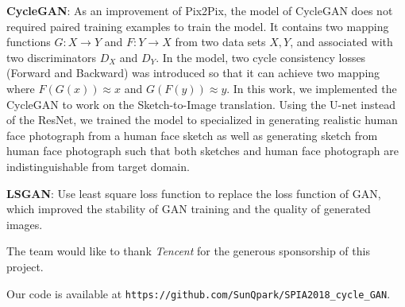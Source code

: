 \textbf{CycleGAN}: As an improvement of Pix2Pix, the model of CycleGAN does not required paired training examples to train the model. It contains two mapping functions $G:X\rightarrow Y$ and $F:Y\rightarrow X$ from two data sets $X,Y$, and associated with two discriminators $D_{X}$ and $D_{Y}$. In the model, two cycle consistency losses (Forward and Backward) was introduced so that it can achieve two mapping where $F(G(x))\approx x$ and $G(F(y))\approx y$\cite{CycleGAN}. In this work, we implemented the CycleGAN to work on the Sketch-to-Image translation. Using the U-net instead of the ResNet, we trained the model to specialized in generating realistic human face photograph from a human face sketch as well as generating sketch from human face photograph such that both sketches and human face photograph are indistinguishable from target domain.

\textbf{LSGAN}: Use least square loss function to replace the loss function of GAN, which improved the stability of GAN training and the quality of generated images.

The team would like to thank \emph{Tencent} for the generous sponsorship of this project. 




Our code is available at \texttt{https://github.com/SunQpark/SPIA2018\_cycle\_GAN}.




\endinput




